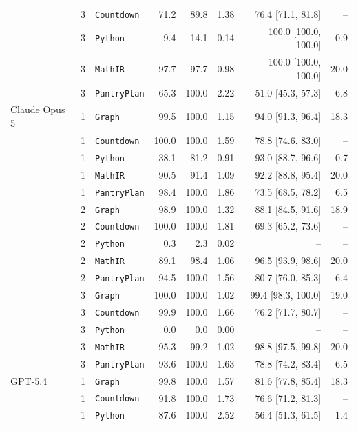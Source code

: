 \begin{longtable}{@{}lrlrrrrr@{}}
     & 3 & \texttt{Countdown} & 71.2 & 89.8 & 1.38 & 76.4 [71.1, 81.8] & -- \\
     & 3 & \texttt{Python} & 9.4 & 14.1 & 0.14 & 100.0 [100.0, 100.0] & 0.9 \\
     & 3 & \texttt{MathIR} & 97.7 & 97.7 & 0.98 & 100.0 [100.0, 100.0] & 20.0 \\
     & 3 & \texttt{PantryPlan} & 65.3 & 100.0 & 2.22 & 51.0 [45.3, 57.3] & 6.8 \\
    \addlinespace[2pt]
    Claude Opus 5 & 1 & \texttt{Graph} & 99.5 & 100.0 & 1.15 & 94.0 [91.3, 96.4] & 18.3 \\
     & 1 & \texttt{Countdown} & 100.0 & 100.0 & 1.59 & 78.8 [74.6, 83.0] & -- \\
     & 1 & \texttt{Python} & 38.1 & 81.2 & 0.91 & 93.0 [88.7, 96.6] & 0.7 \\
     & 1 & \texttt{MathIR} & 90.5 & 91.4 & 1.09 & 92.2 [88.8, 95.4] & 20.0 \\
     & 1 & \texttt{PantryPlan} & 98.4 & 100.0 & 1.86 & 73.5 [68.5, 78.2] & 6.5 \\
     & 2 & \texttt{Graph} & 98.9 & 100.0 & 1.32 & 88.1 [84.5, 91.6] & 18.9 \\
     & 2 & \texttt{Countdown} & 100.0 & 100.0 & 1.81 & 69.3 [65.2, 73.6] & -- \\
     & 2 & \texttt{Python} & 0.3 & 2.3 & 0.02 & -- & -- \\
     & 2 & \texttt{MathIR} & 89.1 & 98.4 & 1.06 & 96.5 [93.9, 98.6] & 20.0 \\
     & 2 & \texttt{PantryPlan} & 94.5 & 100.0 & 1.56 & 80.7 [76.0, 85.3] & 6.4 \\
     & 3 & \texttt{Graph} & 100.0 & 100.0 & 1.02 & 99.4 [98.3, 100.0] & 19.0 \\
     & 3 & \texttt{Countdown} & 99.9 & 100.0 & 1.66 & 76.2 [71.7, 80.7] & -- \\
     & 3 & \texttt{Python} & 0.0 & 0.0 & 0.00 & -- & -- \\
     & 3 & \texttt{MathIR} & 95.3 & 99.2 & 1.02 & 98.8 [97.5, 99.8] & 20.0 \\
     & 3 & \texttt{PantryPlan} & 93.6 & 100.0 & 1.63 & 78.8 [74.2, 83.4] & 6.5 \\
    \addlinespace[2pt]
    GPT-5.4 & 1 & \texttt{Graph} & 99.8 & 100.0 & 1.57 & 81.6 [77.8, 85.4] & 18.3 \\
     & 1 & \texttt{Countdown} & 91.8 & 100.0 & 1.73 & 76.6 [71.2, 81.3] & -- \\
     & 1 & \texttt{Python} & 87.6 & 100.0 & 2.52 & 56.4 [51.3, 61.5] & 1.4 \\

\end{longtable}
